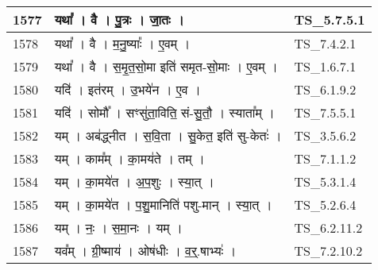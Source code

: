 \documentclass[17pt]{extarticle}
\begin{document}
\begin{longtable}{||p{0.4in}||p{4.9in}||p{0.9in}||}
    \hline
        
    1577 & यथा᳚   ।   वै   ।   पु॒त्रः   ।   जा॒तः   ।    & TS\_5.7.5.1       \\
    
    \hline
        
    1578 & यथा᳚   ।   वै   ।   म॒नु॒ष्याः᳚   ।   ए॒वम्   ।    & TS\_7.4.2.1       \\
    
    \hline
        
    1579 & यथा᳚   ।   वै   ।   स॒मृ॒त॒सो॒मा इति॑ समृत{-}सो॒माः   ।   ए॒वम्   ।    & TS\_1.6.7.1       \\
    
    \hline
        
    1580 & यदि॑   ।   इत॑रम्   ।   उ॒भये॑न   ।   ए॒व   ।    & TS\_6.1.9.2       \\
    
    \hline
        
    1581 & यदि॑   ।   सोमौ᳚   ।   सꣳसु॑ता॒विति॒ सं{-}सु॒तौ॒   ।   स्याता᳚म्   ।    & TS\_7.5.5.1       \\
    
    \hline
        
    1582 & यम्   ।   अब॑द्ध्नीत   ।   स॒वि॒ता   ।   सु॒केत॒ इति॑ सु{-}केतः॑   ।    & TS\_3.5.6.2       \\
    
    \hline
        
    1583 & यम्   ।   काम᳚म्   ।   का॒मय॑ते   ।   तम्   ।    & TS\_7.1.1.2       \\
    
    \hline
        
    1584 & यम्   ।   का॒मये॑त   ।   अ॒प॒शुः   ।   स्या॒त्   ।    & TS\_5.3.1.4       \\
    
    \hline
        
    1585 & यम्   ।   का॒मये॑त   ।   प॒शु॒मानिति॑ पशु{-}मान्   ।   स्या॒त्   ।    & TS\_5.2.6.4       \\
    
    \hline
        
    1586 & यम्   ।   नः॒   ।   स॒मा॒नः   ।   यम्   ।    & TS\_6.2.11.2       \\
    
    \hline
        
    1587 & यव᳚म्   ।   ग्री॒ष्माय॑   ।   ओष॑धीः   ।   व॒र्॒.षाभ्यः॑   ।    & TS\_7.2.10.2       \\
    

\end{longtable}
\end{document}
